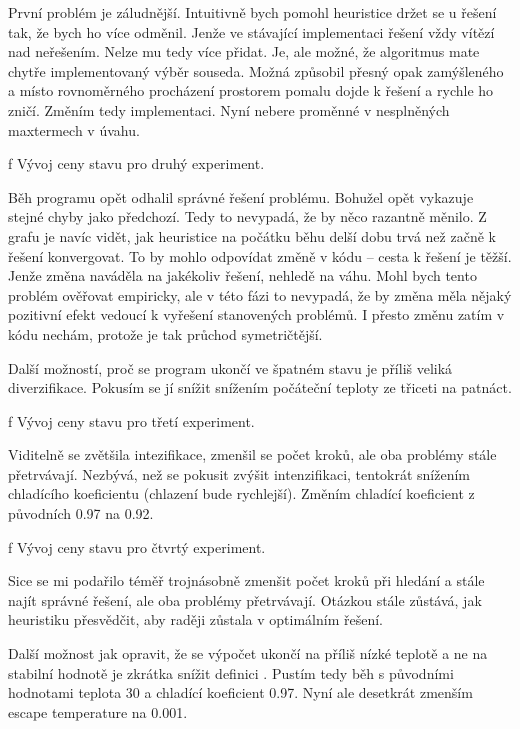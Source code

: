 První problém je záludnější. Intuitivně bych pomohl heuristice držet se u řešení tak, že bych ho více odměnil. Jenže ve stávající implementaci řešení vždy vítězí nad neřešením. Nelze mu tedy více přidat. Je, ale možné, že algoritmus mate chytře implementovaný výběr souseda. Možná způsobil přesný opak zamýšleného a místo rovnoměrného procházení prostorem pomalu dojde k řešení a rychle ho zničí. Změním tedy implementaci. Nyní nebere proměnné v nesplněných maxtermech v úvahu.

\centerline{ \picwidth=15cm  }
\caption/f Vývoj ceny stavu pro druhý experiment.
\bigskip

Běh programu opět odhalil správné řešení problému. Bohužel opět vykazuje stejné chyby jako předchozí. Tedy to nevypadá, že by něco razantně měnilo. Z grafu je navíc vidět, jak heuristice na počátku běhu delší dobu trvá než začně k řešení konvergovat. To by mohlo odpovídat změně v kódu -- cesta k řešení je těžší. Jenže změna naváděla na jakékoliv řešení, nehledě na váhu. Mohl bych tento problém ověřovat empiricky, ale v této fázi to nevypadá, že by změna měla nějaký pozitivní efekt vedoucí k vyřešení stanovených problémů. I přesto změnu zatím v kódu nechám, protože je tak průchod symetričtější.

Další možností, proč se program ukončí ve špatném stavu je příliš veliká diverzifikace. Pokusím se jí snížit snížením počáteční teploty ze třiceti na patnáct.

\centerline{ \picwidth=15cm  }
\caption/f Vývoj ceny stavu pro třetí experiment.
\bigskip

Viditelně se zvětšila intezifikace, zmenšil se počet kroků, ale oba problémy stále přetrvávají. Nezbývá, než se pokusit zvýšit intenzifikaci, tentokrát snížením chladícího koeficientu (chlazení bude rychlejší). Změním chladící koeficient z původních 0.97 na 0.92.

\centerline{ \picwidth=14cm  }
\caption/f Vývoj ceny stavu pro čtvrtý experiment.
\bigskip

Sice se mi podařilo téměř trojnásobně zmenšit počet kroků při hledání a stále najít správné řešení, ale oba problémy přetrvávají. Otázkou stále zůstává, jak heuristiku přesvědčit, aby raději zůstala v optimálním řešení.

Další možnost jak opravit, že se výpočet ukončí na příliš nízké teplotě a ne na stabilní hodnotě je zkrátka snížit definici . Pustím tedy běh s původními hodnotami teplota 30 a chladící koeficient 0.97. Nyní ale desetkrát zmenším escape temperature na 0.001.

